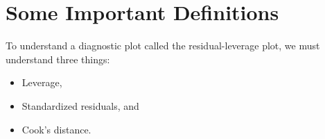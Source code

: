\documentclass[residuals.tex]{subfiles}
\begin{document}
\newpage
\Large
\section{Some Important Definitions}

To understand a diagnostic plot called the residual-leverage plot, we must understand three things:

\begin{itemize}
	\item Leverage,
	\item Standardized residuals, and
	\item Cook's distance.
\end{itemize}




\newpage
\end{document}
